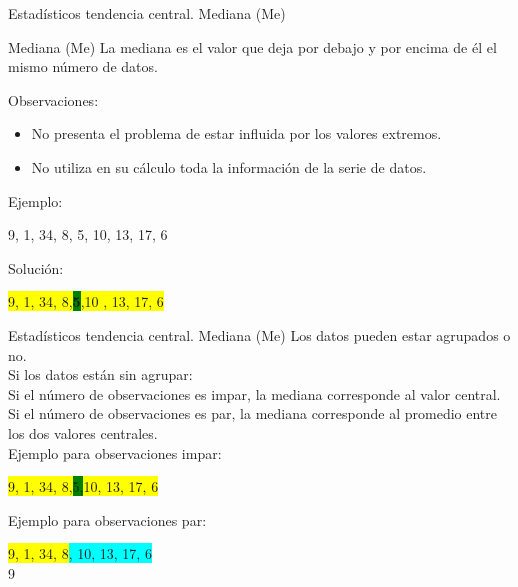 \documentclass[11pt]{beamer}
\begin{document}
        \begin{frame}{Estadísticos tendencia central. Mediana (Me)}
            \begin{block}{Mediana (Me)}
                La mediana es el valor que deja por debajo y por encima de él el mismo  número de datos.
            \end{block}
            Observaciones:
            \begin{itemize}
                \item No presenta el problema de estar influida por los valores extremos.
                \item No utiliza en su cálculo toda la información de la serie de datos.
            \end{itemize}
            Ejemplo:
            \begin{center}
               9, 1, 34, 8, 5, 10, 13, 17, 6
            \end{center}
            \pause
            Solución:
            \begin{center}
              \colorbox{yellow}{  9, 1, 34, 8,}\textbf{\colorbox{green}{5}}\colorbox{yellow}{,10 , 13, 17, 6 }
            \end{center}
        \end{frame}

        \begin{frame}{Estadísticos tendencia central. Mediana (Me)}
           Los datos pueden estar agrupados o no.\\

           \pause
           Si los datos están sin agrupar: \\
           Si el número de observaciones es impar, la mediana corresponde al valor central. Si el número de observaciones es par, la mediana corresponde al promedio entre los dos valores centrales.\\
           Ejemplo para observaciones impar:
           \begin{center}
               \colorbox{yellow}{9, 1, 34, 8,}\colorbox{green}{5,}\colorbox{yellow}{10, 13, 17, 6 }
           \end{center}

           Ejemplo para observaciones par:

           \begin{center}
             \colorbox{yellow}{  9, 1, 34, 8}\colorbox{cyan}{, 10, 13, 17, 6 } \\
             9
           \end{center}
        \end{frame}
\end{document}
